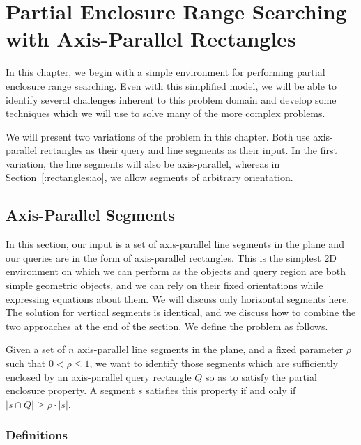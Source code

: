 \chapter{Partial Enclosure Range Searching with Axis-Parallel Rectangles}
\label{:rectangles}

In this chapter, we begin with a simple environment for performing partial enclosure range searching. 
Even with this simplified model, we will be able to identify several challenges inherent to this problem domain and develop some techniques which we will use to solve many of the more complex problems.

We will present two variations of the \PERS{} problem in this chapter. 
Both use axis-parallel rectangles as their query and line segments as their input. 
In the first variation, the line segments will also be axis-parallel, whereas in Section~\ref{:rectangles:ao}, we allow segments of arbitrary orientation.

\section{Axis-Parallel Segments}
\label{:rectangles:ap}

In this section, our input is a set of axis-parallel line segments in the plane and our queries are in the form of axis-parallel rectangles.
This is the simplest 2D environment on which we can perform \PERS{} as the objects and query region are both simple geometric objects, and we can rely on their fixed orientations while expressing equations about them. 
We will discuss only horizontal segments here.
The solution for vertical segments is identical, and we discuss how to combine the two approaches at the end of the section. We define the problem as follows.

\begin{problem}
Given a set of $n$ axis-parallel line segments in the plane, and a fixed parameter $\rho$ such that $0 < \rho \leq 1$, we want to identify those segments which are sufficiently enclosed by an axis-parallel query rectangle $Q$ so as to satisfy the partial enclosure property. 
A segment $s$ satisfies this property if and only if $|s \cap Q| \geq \rho \cdot |s|$.
\end{problem}


\subsection{Definitions}
\label{:rectangles:ap:defs}

